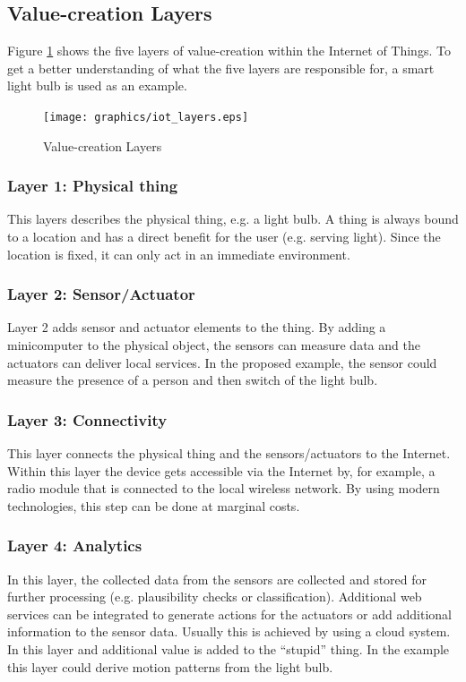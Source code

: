 \subsection{Value-creation Layers}

Figure \ref{fig:value_creation_layers} shows the five layers of value-creation within the Internet of Things. To get a better understanding of what the five layers are responsible for, a smart light bulb is used as an example.

\begin{figure}[h]
	\centering
		\texttt{[image: graphics/iot\_layers.eps]}
	\caption{Value-creation Layers\cite{iotfleisch}}
	\label{fig:value_creation_layers}
\end{figure}

\subsubsection{Layer 1: Physical thing}
This layers describes the physical thing, e.g. a light bulb. A thing is always bound to a location and has a direct benefit for the user (e.g. serving light). Since the location is fixed, it can only act in an immediate environment.

\subsubsection{Layer 2: Sensor/Actuator}
Layer 2 adds sensor and actuator elements to the thing. By adding a minicomputer to the physical object, the sensors can measure data and the actuators can deliver local services. In the proposed example, the sensor could measure the presence of a person and then switch of the light bulb.

\subsubsection{Layer 3: Connectivity}
This layer connects the physical thing and the sensors/actuators to the Internet. Within this layer the device gets accessible via the Internet by, for example, a radio module that is connected to the local wireless network. By using modern technologies, this step can be done at marginal costs.

\subsubsection{Layer 4: Analytics}
In this layer, the collected data from the sensors are collected and stored for further processing (e.g. plausibility checks or classification). Additional web services can be integrated to generate actions for the actuators or add additional information to the sensor data. Usually this is achieved by using a cloud system. In this layer and additional value is added to the ``stupid'' thing. In the example this layer could derive motion patterns from the light bulb.

